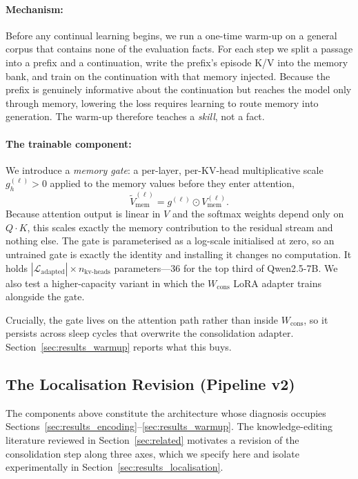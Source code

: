 \paragraph{Mechanism:} Before any continual learning begins, we run a one-time warm-up on a general corpus that contains none of the evaluation facts. For each step we split a passage into a prefix and a continuation, write the prefix's episode K/V into the memory bank, and train on the continuation with that memory injected. Because the prefix is genuinely informative about the continuation but reaches the model only through memory, lowering the loss requires learning to route memory into generation. The warm-up therefore teaches a \emph{skill}, not a fact.

\paragraph{The trainable component:} We introduce a \emph{memory gate}: a per-layer, per-KV-head multiplicative scale $g^{(\ell)}_h > 0$ applied to the memory values before they enter attention,
\begin{equation}
\label{eq:gate}
\tilde{V}^{(\ell)}_{\mathrm{mem}} = g^{(\ell)} \odot V^{(\ell)}_{\mathrm{mem}}.
\end{equation}
Because attention output is linear in $V$ and the softmax weights depend only on $Q\cdot K$, this scales exactly the memory contribution to the residual stream and nothing else. The gate is parameterised as a log-scale initialised at zero, so an untrained gate is exactly the identity and installing it changes no computation. It holds $|\mathcal{L}_{\mathrm{adapted}}| \times n_{\mathrm{kv\text{-}heads}}$ parameters---36 for the top third of Qwen2.5-7B. We also test a higher-capacity variant in which the $W_{\mathrm{cons}}$ LoRA adapter trains alongside the gate.

Crucially, the gate lives on the attention path rather than inside $W_{\mathrm{cons}}$, so it persists across sleep cycles that overwrite the consolidation adapter. Section~\ref{sec:results_warmup} reports what this buys.

\subsection{The Localisation Revision (Pipeline v2)}
\label{sec:method_v2}

The components above constitute the architecture whose diagnosis occupies Sections~\ref{sec:results_encoding}--\ref{sec:results_warmup}. The knowledge-editing literature reviewed in Section~\ref{sec:related} motivates a revision of the consolidation step along three axes, which we specify here and isolate experimentally in Section~\ref{sec:results_localisation}.

